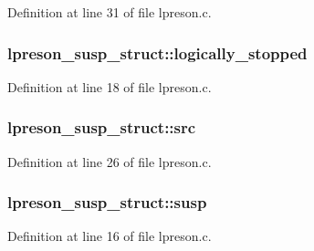 Definition at line 31 of file lpreson.\+c.

\subsubsection[{\texorpdfstring{logically\+\_\+stopped}{logically_stopped}}]{ lpreson\+\_\+susp\+\_\+struct\+::logically\+\_\+stopped}\hypertarget{structlpreson__susp__struct_a55246cc05bc58ee262d302fc8c729f4f}{}\label{structlpreson__susp__struct_a55246cc05bc58ee262d302fc8c729f4f}


Definition at line 18 of file lpreson.\+c.

\subsubsection[{\texorpdfstring{src}{src}}]{ lpreson\+\_\+susp\+\_\+struct\+::src}\hypertarget{structlpreson__susp__struct_a8d3297b262a40bff864dd88b061fbd41}{}\label{structlpreson__susp__struct_a8d3297b262a40bff864dd88b061fbd41}


Definition at line 26 of file lpreson.\+c.

\subsubsection[{\texorpdfstring{susp}{susp}}]{ lpreson\+\_\+susp\+\_\+struct\+::susp}\hypertarget{structlpreson__susp__struct_a9fa83fd496295a2ec531971508ad0f55}{}\label{structlpreson__susp__struct_a9fa83fd496295a2ec531971508ad0f55}


Definition at line 16 of file lpreson.\+c.

